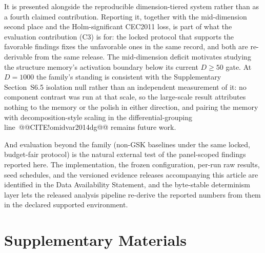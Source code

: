 \documentclass[10pt,a4paper]{article}
\begin{document}
It is
presented alongside the reproducible dimension-tiered system rather than as a
fourth claimed contribution. Reporting it, together with the mid-dimension
second place and the Holm-significant CEC2011 loss, is part of what the
evaluation contribution (C3) is for: the locked protocol that supports the
favorable findings fixes the unfavorable ones in the same record, and both are
re-derivable from the same release.
The mid-dimension deficit
motivates studying the structure memory's activation boundary below its
current $D \geq 50$ gate. At $D = 1000$ the family's standing is
consistent with the Supplementary Section~S6.5 isolation null rather than an
independent measurement of it: no component contrast was run at that
scale, so the large-scale result attributes nothing to the memory or the
polish in either direction, and pairing the memory with
decomposition-style scaling in the differential-grouping
line~@@CITE!omidvar2014dg@@ remains future work.

And evaluation beyond the family (non-GSK baselines under the same
locked, budget-fair protocol) is the natural external test of the
panel-scoped findings reported here. The implementation, the frozen
configuration, per-run raw results, seed schedules, and the versioned
evidence releases accompanying this article are identified in the Data
Availability Statement, and the byte-stable determinism layer
lets the released analysis pipeline re-derive the reported
numbers from them in the declared supported environment. 



















\section*{Supplementary Materials}
\end{document}

